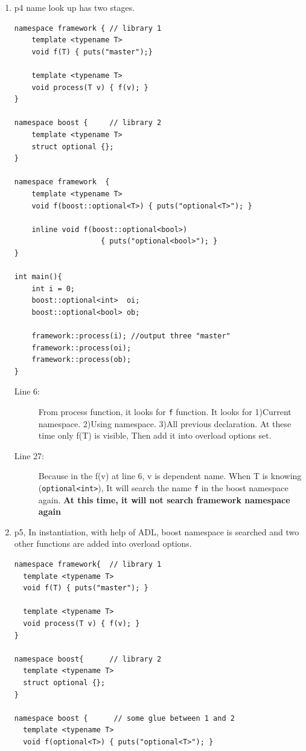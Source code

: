 \documentclass[a4paper,11pt,twoside]{book}
\begin{document}
\begin{itemize}
\begin{enumerate}
\item p4 name look up has two stages. 

\begin{lstlisting}[]
namespace framework { // library 1
	template <typename T>
	void f(T) { puts("master");}
 
	template <typename T>
	void process(T v) { f(v); }
}
 
namespace boost {     // library 2
	template <typename T>
	struct optional {};
}
 
namespace framework  {     
	template <typename T>
	void f(boost::optional<T>) { puts("optional<T>"); }
    
	inline void f(boost::optional<bool>) 
	                { puts("optional<bool>"); }
}
 
int main(){
	int i = 0;
	boost::optional<int>  oi;
	boost::optional<bool> ob;
  
	framework::process(i); //output three "master"
	framework::process(oi);
	framework::process(ob);
}
\end{lstlisting}

\begin{description}
	\item[Line 6:] From process function, it looks for \texttt{f} function. It looks for 1)Current namespace. 2)Using namespace. 3)All previous declaration.
	 At these time only f(T) is visible, Then add it into overload options set.  
	 
	 \item[Line 27:] Because in the f(v) at line 6, v is dependent name. When T is knowing \\ (\texttt{optional<int>}), It will search the name \texttt{f} in the boost namespace again.  \textbf{At this time, it will not search framework namespace again}
\end{description}


\item p5, In instantiation, with help of ADL, boost namespace is searched and two other functions are added into overload options.

\begin{lstlisting}[]
namespace framework{  // library 1
  template <typename T>
  void f(T) { puts("master"); }
 
  template <typename T>
  void process(T v) { f(v); } 
}
 
namespace boost{      // library 2
  template <typename T>
  struct optional {};
}
 
namespace boost {      // some glue between 1 and 2
  template <typename T>
  void f(optional<T>) { puts("optional<T>"); }
    

\end{lstlisting}
\end{enumerate}
\end{itemize}
\end{document}
